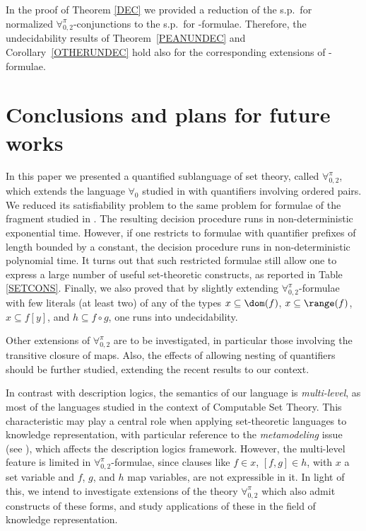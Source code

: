 \documentclass[submission,copyright,creativecommons]{eptcs}
\newcommand{\Lang}{\ensuremath{\mathbf{\forall}^{\pi}_{0,2}}\xspace}
\newcommand{\svx}{x}
\newcommand{\svy}{y}
\newcommand{\mvx}{f}
\newcommand{\mvy}{g}
\newcommand{\mvz}{h}
\begin{document}
In the proof of Theorem \ref{DEC} we provided a reduction of the s.p.\
for normalized \Lang-conjunctions to the s.p.\ for
\Forallpizero-formulae.  Therefore, the undecidability results of 
Theorem~\ref{PEANUNDEC} and Corollary~\ref{OTHERUNDEC} hold also for 
the corresponding extensions of \Forallpizero-formulae.

\section{Conclusions and plans for future works}
\label{CONC}

In this paper we presented a quantified sublanguage of set theory,
called \Lang, which extends the language $\forall_{0}$ studied in
\cite{BreFerOmoSch1981} with quantifiers involving ordered pairs.  We
reduced its satisfiability problem to the same problem for formulae of
the fragment studied in \cite{CanLonNic2011}.  The resulting decision
procedure runs in non-deterministic exponential time.  However, if one
restricts to formulae with quantifier prefixes of length bounded by a
constant, the decision procedure runs in non-deterministic polynomial
time.  It turns out that such restricted formulae still allow one to
express a large number of useful set-theoretic constructs, as reported
in Table \ref{SETCONS}.  
Finally, we also proved that by slightly extending \Lang-formulae 
with few literals (at least two) of any of the types $\svx
\subseteq \dom(\mvx)$, $\svx \subseteq \range(\mvx)$, $\svx \subseteq
\mvx[\svy]$, and $h \subseteq f \circ g$, one runs into 
undecidability.

Other extensions of \Lang are to be investigated, in particular those
involving the transitive closure of maps.  Also, the effects of
allowing nesting of quantifiers should be further studied, extending 
the recent results \cite{OmoPol2010, OmoPol2012} to our context.

In contrast with description logics, the semantics of our language is
\emph{multi-level}, as most of the languages studied in the context of
Computable Set Theory. This characteristic may play
a central role when applying set-theoretic languages to knowledge
representation, with particular reference to the \emph{metamodeling} issue
(see \cite{WelFer1994, Mot2007}), which affects the description logics
framework.
However, the multi-level feature is limited in \Lang-formulae, since
clauses like $\mvx \in \svx$, $[\mvx, \mvy] \in \mvz$, 
with $\svx$ a set variable and $\mvx$, $\mvy$, and $\mvz$ map
variables, are not expressible in it.
In light of this, we intend to investigate extensions of the theory
\Lang which also admit constructs of these forms, and study
applications of these in the field of knowledge representation.
\end{document}
